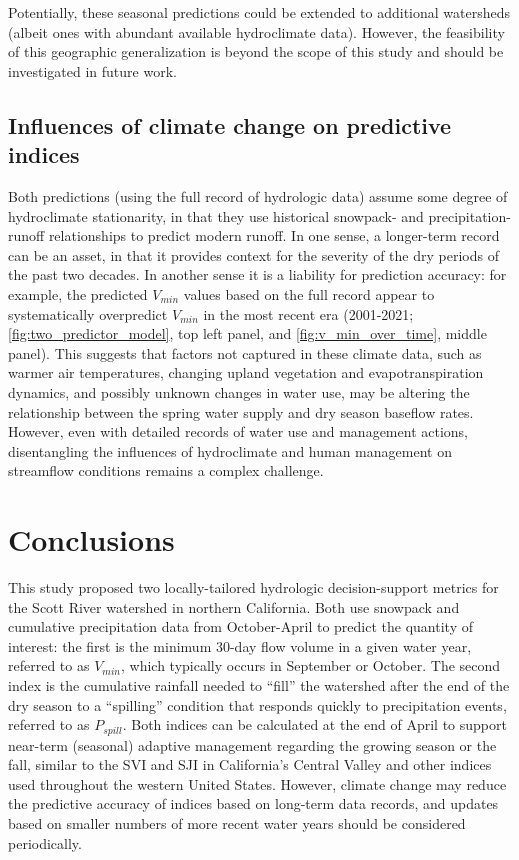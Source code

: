 \documentclass[hess, manuscript]{copernicus}
\begin{document}
Potentially, these seasonal predictions could be extended to additional
watersheds (albeit ones with abundant available hydroclimate data).
However, the feasibility of this geographic generalization is beyond the
scope of this study and should be investigated in future work.

\subsection{Influences of climate change on predictive indices}

Both predictions (using the full record of hydrologic data) assume some
degree of hydroclimate stationarity, in that they use historical
snowpack- and precipitation-runoff relationships to predict modern
runoff. In one sense, a longer-term record can be an asset, in that it
provides context for the severity of the dry periods of the past two
decades. In another sense it is a liability for prediction accuracy: for
example, the predicted \(V_{min}\) values based on the full record
appear to systematically overpredict \(V_{min}\) in the most recent era
(2001-2021; \autoref{fig:two_predictor_model}, top left panel, and
\autoref{fig:v_min_over_time}, middle panel). This suggests that factors
not captured in these climate data, such as warmer air temperatures,
changing upland vegetation and evapotranspiration dynamics, and possibly
unknown changes in water use, may be altering the relationship between
the spring water supply and dry season baseflow rates. However, even
with detailed records of water use and management actions, disentangling
the influences of hydroclimate and human management on streamflow
conditions remains a complex challenge.

\section{Conclusions}

This study proposed two locally-tailored hydrologic decision-support
metrics for the Scott River watershed in northern California. Both use
snowpack and cumulative precipitation data from October-April to predict
the quantity of interest: the first is the minimum 30-day flow volume in
a given water year, referred to as \(V_{min}\), which typically occurs
in September or October. The second index is the cumulative rainfall
needed to ``fill'' the watershed after the end of the dry season to a
``spilling'' condition that responds quickly to precipitation events,
referred to as \(P_{spill}\). Both indices can be calculated at the end
of April to support near-term (seasonal) adaptive management regarding
the growing season or the fall, similar to the SVI and SJI in
California's Central Valley and other indices used throughout the
western United States. However, climate change may reduce the predictive
accuracy of indices based on long-term data records, and updates based
on smaller numbers of more recent water years should be considered
periodically.
\end{document}
